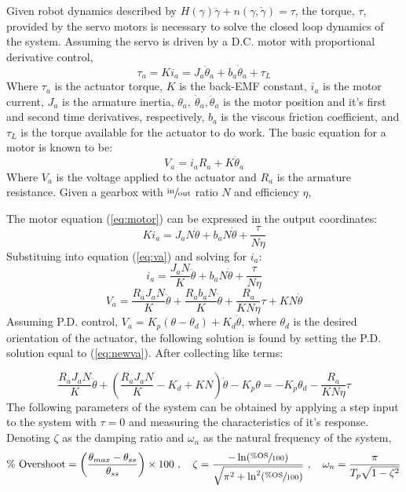 \documentclass[12pt]{report}
\begin{document}
Given robot dynamics described by \(H(\gamma)\ddot{\gamma} + n(\gamma,\dot{\gamma}) = \tau\), the torque, $\tau$, provided by the servo motors is necessary to solve the closed loop dynamics of the system. Assuming the servo is driven by a D.C. motor with proportional derivative control,
\begin{equation}
  \tau_a = Ki_a = J_a\ddot{\theta}_a + b_a\dot{\theta}_a + \tau_L
  \label{eq:motor}
\end{equation}
Where $\tau_a$ is the actuator torque, $K$ is the back-EMF constant, $i_a$ is the motor current, $J_a$ is the armature inertia, $\theta_a,~\dot{\theta}_a,\ddot{\theta}_a$ is the motor position and it's first and second time derivatives, respectively, $b_a$ is the viscous friction coefficient, and $\tau_L$ is the torque available for the actuator to do work. The basic equation for a motor is known to be:
\begin{equation}
  V_a = i_aR_a + K\dot{\theta}_a
  \label{eq:va}
\end{equation}
Where $V_a$ is the voltage applied to the actuator and $R_a$ is the armature resistance. Given a gearbox with $\sfrac{\text{in}}{\text{out}}$ ratio $N$ and efficiency $\eta$,

The motor equation (\ref{eq:motor}) can be expressed in the output coordinates:
\[
Ki_a = J_aN\ddot{\theta} + b_aN\dot{\theta} + \frac{\tau}{N\eta}
\]
Substituing into equation (\ref{eq:va}) and solving for $i_a$:
\[
  i_a = \frac{J_aN}{K}\ddot{\theta} + b_aN\dot{\theta} + \frac{\tau}{N\eta}
\]
\begin{equation}
  V_a = \frac{R_aJ_aN}{K}\ddot{\theta} + \frac{R_ab_aN}{K}\dot{\theta} + \frac{R_a}{KN\eta}\tau + KN\dot{\theta}
  \label{eq:newva}
\end{equation}
Assuming P.D. control, \(V_a = K_p(\theta-\theta_d) + K_d\dot{\theta}\), where $\theta_d$ is the desired orientation of the actuator, the following solution is found by setting the P.D. solution equal to (\ref{eq:newva}). After collecting like terms:

\begin{equation}
  \frac{R_aJ_aN}{K}\ddot{\theta} + \left( \frac{R_aJ_aN}{K} - K_d + KN \right)\dot{\theta} - K_p\theta = -K_p\theta_d - \frac{R_a}{KN\eta}\tau
  \label{eq:end1}
\end{equation}
\newpage
The following parameters of the system can be obtained by applying a step input to the system with $\tau=0$ and measuring the characteristics of it's response. Denoting $\zeta$ as the damping ratio and $\omega_n$ as the natural frequency of the system,
\[
  \text{\% Overshoot} = \left( \frac{\theta_{max} - \theta_{ss}}{\theta_{ss}} \right) \times 100~,\quad \zeta = \frac{-\ln(\sfrac{\%\text{OS}}{100})}{\sqrt{\pi^2 + \ln^2(\sfrac{\%\text{OS}}{100})}}~,\quad \omega_n = \frac{\pi}{T_p\sqrt{1-\zeta^2}}
\]
\end{document}
